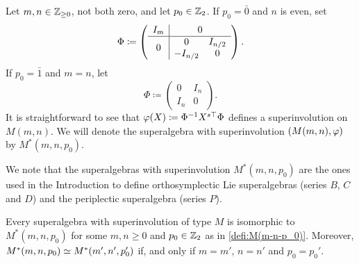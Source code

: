 \begin{defi}\label{defi:M(m-n-p_0)}
    Let $m,n \in \mathbb{Z}_{\geq 0}$, not both zero, and let $p_0 \in \mathbb{Z}_2$. 
    If $p_0 = \bar 0$ and $n$ is even, set 
    \[
        \sbox0{$\begin{matrix} 0& I_{n/2}\\ -I_{n/2}& 0\end{matrix}$}
        \Phi \coloneqq \left(\begin{array}{c|c}
                    I_m & 0\\
                    \hline
                    0 & \usebox{0}
                \end{array}\right).
    \]
    If $p_0 = \bar 1$ and $m = n$, let
    \[
        \Phi \coloneqq \left(\begin{array}{c|c}
                    0 & I_n\\
                    \hline 
                    I_n & 0
                \end{array}\right).
    \]
    It is straightforward to see that $\varphi(X) \coloneqq \Phi^{-1} X^{s\top} \Phi$ defines a superinvolution on $M(m,n)$. 
    We will denote the superalgebra with superinvolution $(M(m,n), \varphi)$ by $M^*(m,n, p_0)$. 
\end{defi}

We note that the superalgebras with superinvolution $M^*(m,n,p_0)$ are the ones used in the Introduction to define orthosymplectic Lie superalgebras (series $B$, $C$ and $D$) and the periplectic superalgebra (series $P$).

\begin{prop}\label{prop:iso-M-with-vphi}
    Every superalgebra with superinvolution of type $M$ is isomorphic to $M^*(m,n, p_0)$ for some $m,n \geq 0$ and $p_0 \in \mathbb{Z}_2$ as in \cref{defi:M(m-n-p_0)}. 
    Moreover, $M^*(m,n, p_0) \simeq M^*(m',n', p_0')$ if, and only if $m = m'$, $n = n'$ and $p_0 = p_0'$.
\end{prop}

